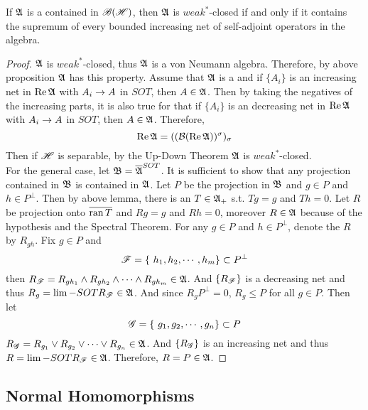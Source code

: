 \begin{thm} \label{thm16}
	If $\mathfrak{A}$ is a \Cs contained in $\mathscr{B(H)}$, then $\mathfrak{A}$ is $weak^*$-closed if and only if it contains the supremum of every bounded increasing net of self-adjoint operators in the algebra.
\end{thm}
\begin{proof}
	$\mathfrak{A}$ is $weak^*$-closed, thus $\mathfrak{A}$ is  a von Neumann algebra. Therefore, by above proposition $\mathfrak{A}$ has this property. Assume that $\mathfrak{A}$ is a \Cs and if $\{A_i\}$ is an increasing net in $\operatorname{Re}{\mathfrak{A}}$ with $A_i \rightarrow A$ in $SOT$, then $A \in \mathfrak{A}$. Then by taking the negatives of the increasing parts, it is also true for that if $\{A_i\}$ is an decreasing net in $\operatorname{Re}{\mathfrak{A}}$ with $A_i \rightarrow A$ in $SOT$, then $A \in \mathfrak{A}$. Therefore, 
	\begin{equation*}
		\operatorname{Re}{\mathfrak{A}} = ((\mathcal{B}(\operatorname{Re}{\mathfrak{A}}))^{\sigma})_{\sigma}
	\end{equation*}
	Then if $\mathscr{H}$ is separable, by the Up-Down Theorem $\mathfrak{A}$ is $weak^*$-closed. \\
	For the general case, let $\mathfrak{B} = \overline{\mathfrak{A}}^{SOT}$. It is sufficient to show that any projection contained in $\mathfrak{B}$ is contained in $\mathfrak{A}$. Let $P$ be the projection in $\mathfrak{B}$ and $g \in P$ and $h \in P^{\bot}$. Then by above lemma, there is an $T \in \mathfrak{A}_+$ s.t. $Tg = g$ and $Th = 0$. Let $R$ be projection onto $\overline{\operatorname{ran}{T}}$ and $Rg = g$ and $Rh = 0$, moreover $R \in \mathfrak{A}$ because of the hypothesis and the Spectral Theorem. For any $g \in P$ and $h \in P^{\bot}$, denote the $R$ by $R_{gh}$. Fix $g \in P$ and 
	\begin{equation*}
		\mathscr{F} = \{~h_1, h_2, \cdots, h_m\} \subset P^{\bot}
	\end{equation*}
	then $R_{\mathscr{F}} = R_{gh_1} \wedge R_{gh_2} \wedge \cdots \wedge R_{gh_m} \in \mathfrak{A}$. And $\{R_{\mathscr{F}}\}$ is a decreasing net and thus $R_g = \lim-SOT R_{\mathscr{F}} \in \mathfrak{A}$. And since $R_g P^{\bot} = 0$, $R_g \leqslant P$ for all $g \in P$. Then let
	\begin{equation*}
		\mathscr{G} = \{~g_1, g_2, \cdots, g_n\} \subset P
	\end{equation*}
	$R_{\mathscr{G}} = R_{g_1} \vee R_{g_2} \vee \cdots \vee R_{g_n} \in \mathfrak{A}$. And $\{R_{\mathscr{G}}\}$ is an increasing net and thus $R = \lim-SOT R_{\mathscr{F}} \in \mathfrak{A}$. Therefore, $R = P \in \mathfrak{A}$.
\end{proof}

\subsection{Normal Homomorphisms}

